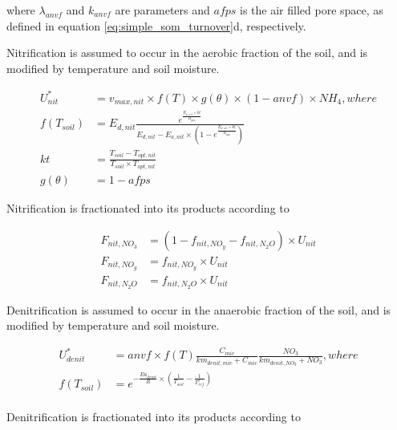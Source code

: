 where $\lambda_{anvf}$ and $k_{anvf}$ are parameters and $afps$ is the air filled pore space, as defined in equation \ref{eq:simple_som_turnover}d, respectively. 

Nitrification is assumed to occur in the aerobic fraction of the soil, and is modified by temperature and soil moisture.  
 
\begin{subequations}\label{eq:sb:simple_dynamic_nitrification}
\begin{align}
U^{*}_{nit} &= v_{max,nit} \times f(T) \times g(\theta) \times (1 - anvf) \times NH_4, where\\
f(T_{soil}) &= E_{d,nit} \frac{e^{\frac{E_{a,nit}\times kt}{R_{gas}}}}{E_{d,nit}-E_{a,nit}\times (1 - e^{\frac{E_{d,nit} \times kt}{R_{gas}}})} \\
kt & = \frac{T_{soil}-T_{opt,nit}}{T_{soil} \times T_{opt,nit}}\\
g(\theta) &= 1-afps
\end{align}
\end{subequations}

Nitrification is fractionated into its products according to

\begin{subequations}\label{eq:sb:simple_dynamic_nitrification_prod}
\begin{align}
F_{nit,NO_3} &= (1 - f_{nit,NO_y} -  f_{nit,N_2O}) \times U_{nit}\\
F_{nit,NO_y} &= f_{nit,NO_y}  \times U_{nit}\\
F_{nit,N_2O} &= f_{nit,N_2O}  \times U_{nit}
\end{align}
\end{subequations}

Denitrification is assumed to occur in the anaerobic fraction of the soil, and is modified by temperature and soil moisture.  
 
\begin{subequations}\label{eq:sb:simple_dynamic_denitrification}
\begin{align}
U^{*}_{denit} &= anvf \times f(T) \frac{C_{mic}}{km_{denit,mic} + C_{mic}} \frac{NO_3}{km_{denit,NO_3} + NO_3}, where\\
f(T_{soil}) &= e^{-\frac{Ea_{denit}}{R} \times (\frac{1}{T_{soil}} - \frac{1}{T^{\tau}_{ref}})}\\
\end{align}
\end{subequations}

Denitrification is fractionated into its products according to

